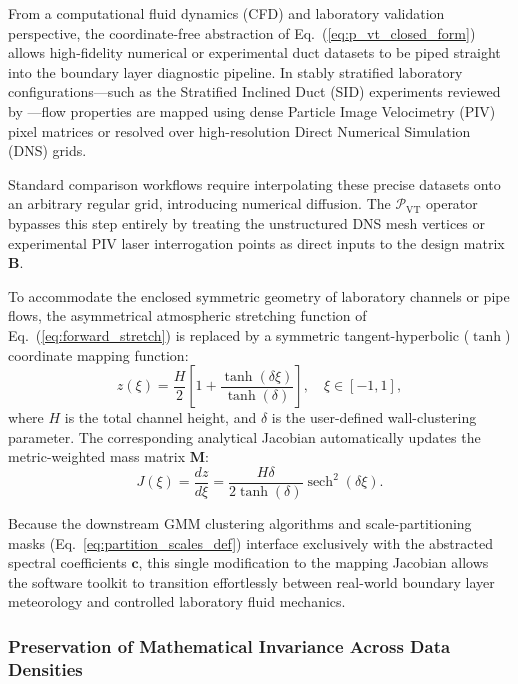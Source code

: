 \documentclass[11pt,a4paper]{article}
\begin{document}
From a computational fluid dynamics (CFD) and laboratory validation perspective, the coordinate-free abstraction of Eq.~(\ref{eq:p_vt_closed_form}) allows high-fidelity numerical or experimental duct datasets to be piped straight into the boundary layer diagnostic pipeline. In stably stratified laboratory configurations—such as the Stratified Inclined Duct (SID) experiments reviewed by \citet{Lefauve2025}—flow properties are mapped using dense Particle Image Velocimetry (PIV) pixel matrices or resolved over high-resolution Direct Numerical Simulation (DNS) grids.

Standard comparison workflows require interpolating these precise datasets onto an arbitrary regular grid, introducing numerical diffusion. The $\mathcal{P}_{\mathrm{VT}}$ operator bypasses this step entirely by treating the unstructured DNS mesh vertices or experimental PIV laser interrogation points as direct inputs to the design matrix $\mathbf{B}$.

To accommodate the enclosed symmetric geometry of laboratory channels or pipe flows, the asymmetrical atmospheric stretching function of Eq.~(\ref{eq:forward_stretch}) is replaced by a symmetric tangent-hyperbolic ($\tanh$) coordinate mapping function:
\begin{equation}
z(\xi) = \frac{H}{2} \left[ 1 + \frac{\tanh(\delta \xi)}{\tanh(\delta)} \right], \quad \xi \in [-1, 1],
\label{eq:lab_symmetric_stretch}
\end{equation}
where $H$ is the total channel height, and $\delta$ is the user-defined wall-clustering parameter. The corresponding analytical Jacobian automatically updates the metric-weighted mass matrix $\mathbf{M}$:
\begin{equation}
J(\xi) = \frac{dz}{d\xi} = \frac{H \delta}{2 \tanh(\delta)} \operatorname{sech}^2(\delta \xi).
\label{eq:jacobian_lab_symmetric}
\end{equation}

Because the downstream GMM clustering algorithms and scale-partitioning masks (Eq.~\ref{eq:partition_scales_def}) interface exclusively with the abstracted spectral coefficients $\mathbf{c}$, this single modification to the mapping Jacobian allows the software toolkit to transition effortlessly between real-world boundary layer meteorology and controlled laboratory fluid mechanics.

\subsubsection{Preservation of Mathematical Invariance Across Data Densities}
\label{sec:extensions:invariance}
\end{document}
